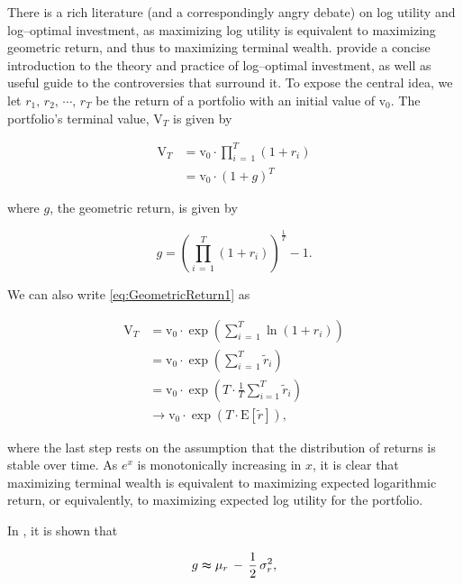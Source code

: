 \documentclass[graybox,envcountchap,sectrefs]{svmono}\usepackage[]{graphicx}\usepackage[]{xcolor}
\begin{document}
\begin{appendices}
There is a rich literature (and a correspondingly angry debate) on
log utility and log--optimal investment, as maximizing log utility
is equivalent to maximizing geometric return, and thus to maximizing
terminal wealth. \citet{MacleanThorpZiemba2010} provide a concise
introduction to the theory and practice of log--optimal investment,
as well as useful guide to the controversies that surround it. To
expose the central idea, we let $r_{1},\,r_{2},\,\cdots,\,r_{T}$
be the return of a portfolio with an initial value of $\mathrm{v}_{0}$.
The portfolio's terminal value, $\mathrm{V}_{T}$ is given by

\begin{align}
\mathrm{V}_{T} & =\mathrm{v}_{0}\cdot\prod_{i\,=\,1}^{T}\left(1+r_{i}\right)\nonumber \\
 & =\mathrm{v}_{0}\cdot\left(1+g\right)^{T}\label{eq:GeometricReturn1}
\end{align}

where $g$, the geometric return, is given by

\begin{equation}
g=\left(\prod_{i\,=\,1}^{T}\left(1+r_{i}\right)\right)^{\frac{1}{T}}-1.\label{eq:GeometricReturn2}
\end{equation}

We can also write \eqref{eq:GeometricReturn1} as

\begin{align}
\mathrm{V}_{T} & =\mathrm{v}_{0}\cdot\exp\left(\sum_{i\,=\,1}^{T}\ln\left(1+r_{i}\right)\right)\nonumber \\
 & =\mathrm{v}_{0}\cdot\exp\left(\sum_{i\,=\,1}^{T}\widetilde{r}_{i}\right)\nonumber \\
 & =\mathrm{v}_{0}\cdot\exp\left(T\cdot\frac{1}{T}\sum_{i=1}^{T}\widetilde{r}_{i}\right)\nonumber \\
 & \longrightarrow\mathrm{v}_{0}\cdot\exp\left(T\cdot\mathrm{E}\left[\widetilde{r}\right]\right),\label{eq:LogUtility1}
\end{align}

where the last step rests on the assumption that the distribution
of returns is stable over time. As $e^{x}$ is monotonically increasing
in $x$, it is clear that maximizing terminal wealth is equivalent
to maximizing expected logarithmic return, or equivalently, to maximizing
expected log utility for the portfolio.

In \AssetReturnsChapter, it is shown that 

\begin{equation}
g\thickapprox\mu_{r}\,-\,\frac{1}{2}\,\sigma_{r}^{2},\label{eq:LogUtility2}
\end{equation}


\end{appendices}
\end{document}
